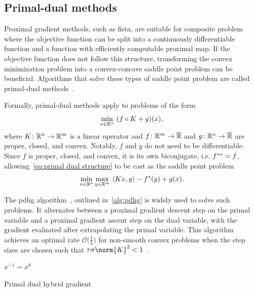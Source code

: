 \subsection{Primal-dual methods}
Proximal gradient methods, such as \gls{fista}, are suitable for composite problem where the objective function can be split into a continuously differentiable function and a function with efficiently computable proximal map.
If the objective function does not follow this structure, transforming the convex minimization problem into a convex-concave saddle point problem can be beneficial.
Algorithms that solve these types of saddle point problem are called primal-dual methods~\cite{chambolle_primal_2010,Rockafellar+1970}.

Formally, primal-dual methods apply to problems of the form
\begin{equation}
	\min_{x\in\mathbb{R}^n}\ (f \circ K + g)(x),
	\label{eq:primal dual structure}
\end{equation}
where \( K \colon \mathbb{R}^n \to \mathbb{R}^m \) is a linear operator and \( f \colon \mathbb{R}^m \to \overline{\mathbb{R}} \) and \( g \colon \mathbb{R}^n \to \overline{\mathbb{R}} \) are proper, closed, and convex.
Notably, \( f \) and \( g \) do not need to be differentiable.
Since \( f \) is proper, closed, and convex, it is its own biconjugate, i.e. \( f^{\ast\ast} = f \), allowing~\cref{eq:primal dual structure} to be cast as the saddle point problem
\begin{equation}
	\min_{x\in \R^n} \max_{y \in \R^m}\ \inprod{Kx}{y} - \ConvexConjugate{f}(y) + g(x).
	\label{eq:primal dual saddle point structure}
\end{equation}

The \gls{pdhg} algorithm~\cite{chambolle_primal_2010}, outlined in~\cref{alg:pdhg} is widely used to solve such problems.
It alternates between a proximal gradient descent step on the primal variable and a proximal gradient ascent step on the dual variable, with the gradient evaluated after extrapolating the primal variable.
This algorithm achieves an optimal rate \( \mathcal{O}\bigl( \frac{\num{1}}{k} \bigr) \) for non-smooth convex problems when the step sizes are chosen such that \( \tau\sigma \norm{K}^2 < \num{1} \)~\cite{chambolle_primal_2010}.
\begin{algorithm}
	\DontPrintSemicolon
	\( x^{\num{-1}} = x^{\num{0}} \)\;
	\caption{Primal dual hybrid gradient~\cite{chambolle_primal_2010}}
	\label{alg:pdhg}
\end{algorithm}

